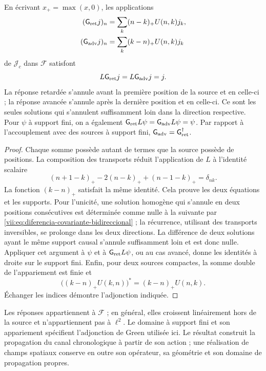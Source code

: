 \begin{theorem}
\label{vii:thm:green-cronologico}
En écrivant \(x_+=\max(x,0)\), les applications
\begin{align}
 (\mathsf{G}_{\rm ret}j)_n&=\sum_k(n-k)_+U(n,k)j_k,\label{vii:eq:green-ret-cronologico}\\
 (\mathsf{G}_{\rm adv}j)_n&=\sum_k(k-n)_+U(n,k)j_k\label{vii:eq:green-adv-cronologico}
\end{align}
de \(\mathcal J_c\) dans \(\mathcal F\) satisfont
\[
 L\mathsf{G}_{\rm ret}j=L\mathsf{G}_{\rm adv}j=j.
\]
La réponse retardée s'annule avant la première position de la source et en celle-ci ; la réponse avancée s'annule après la dernière position et en celle-ci. Ce sont les seules solutions qui s'annulent suffisamment loin dans la direction respective. Pour \(\psi\) à support fini, on a également \(\mathsf{G}_{\rm ret}L\psi=\mathsf{G}_{\rm adv}L\psi=\psi\). Par rapport à l'accouplement avec des sources à support fini, \(\mathsf{G}_{\rm adv}=\mathsf{G}_{\rm ret}^{\dagger}\).
\end{theorem}
\begin{proof}
Chaque somme possède autant de termes que la source possède de positions.
La composition des transports réduit l'application de \(L\) à
l'identité scalaire
\[
 (n+1-k)_+-2(n-k)_++(n-1-k)_+=\delta_{nk}.
\]
La fonction \((k-n)_+\) satisfait la même identité. Cela prouve
les deux équations et les supports. Pour l'unicité, une solution
homogène qui s'annule en deux positions consécutives est déterminée
comme nulle à la suivante par \eqref{vii:eq:diferencia-covariante-bidireccional} ;
la récurrence, utilisant des transports inversibles, se prolonge dans les deux
directions. La différence de deux solutions ayant le même support causal
s'annule suffisamment loin et est donc nulle.
Appliquer cet argument à \(\psi\) et à \(\mathsf{G}_{\rm ret}L\psi\), ou au
cas avancé, donne les identités à droite sur le support fini.
Enfin, pour deux sources compactes, la somme double de l'appariement
est finie et
\[
 \bigl((k-n)_+U(k,n)\bigr)^*=(k-n)_+U(n,k).
\]
Échanger les indices démontre l'adjonction indiquée.
\end{proof}

Les réponses appartiennent à \(\mathcal F\) ; en général, elles croissent
linéairement hors de la source et n'appartiennent pas à \(\ell^2\).
Le domaine à support fini et son appariement spécifient l'adjonction
de Green utilisée ici. Le résultat construit la propagation du canal
chronologique à partir de son action ; une réalisation de champs spatiaux conserve
en outre son opérateur, sa géométrie et son domaine de propagation propres.

